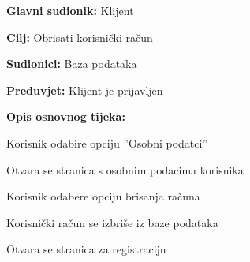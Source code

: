                         \noindent {}
					\begin{packed_item}
	
						\item \textbf{Glavni sudionik: }Klijent
						\item  \textbf{Cilj:} Obrisati korisnički račun
						\item  \textbf{Sudionici:} Baza podataka
						\item  \textbf{Preduvjet:} Klijent je prijavljen
						\item  \textbf{Opis osnovnog tijeka:}
						
						\item[] \begin{packed_enum}
	
							\item Korisnik odabire opciju ”Osobni podatci”
							\item Otvara se stranica s osobnim podacima korisnika
							\item Korisnik odabere opciju brisanja računa
                                \item Korisnički račun se izbriše iz baze podataka
                                \item Otvara se stranica za registraciju
							
						\end{packed_enum}

					\end{packed_item}
                            

